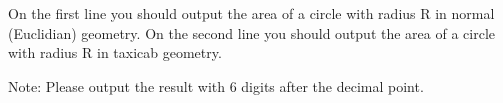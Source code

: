 On the first line you should output the area of a circle with radius R in normal (Euclidian) geometry. On the second line you should output the area of a circle with radius R in taxicab geometry.

Note: Please output the result with 6 digits after the decimal point.